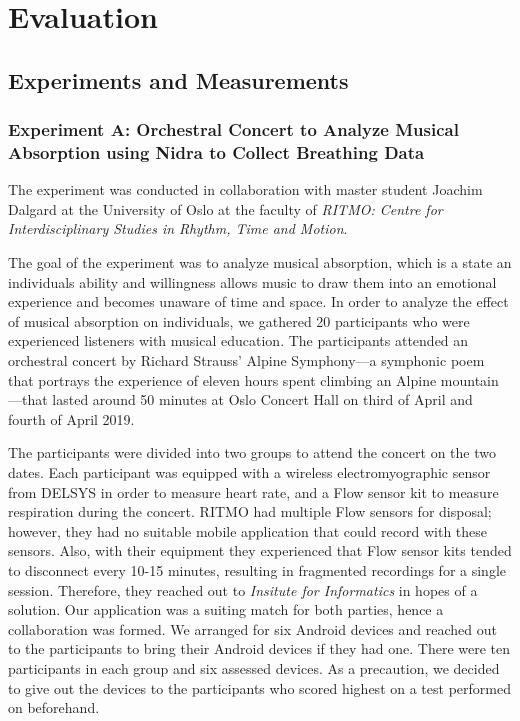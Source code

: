 \chapter{Evaluation}
\section{Experiments and Measurements}
\subsection{Experiment A: Orchestral Concert to Analyze Musical Absorption using Nidra to Collect Breathing Data}
The experiment was conducted in collaboration with master student Joachim Dalgard at the University of Oslo at the faculty of \textit{RITMO: Centre for Interdisciplinary Studies in Rhythm, Time and Motion}. 

The goal of the experiment was to analyze musical absorption, which is a state an individuals ability and willingness allows music to draw them into an emotional experience and becomes unaware of time and space. In order to analyze the effect of musical absorption on individuals, we gathered 20 participants who were experienced listeners with musical education. The participants attended an orchestral concert by Richard Strauss' Alpine Symphony---a symphonic poem that portrays the experience of eleven hours spent climbing an Alpine mountain---that lasted around 50 minutes at Oslo Concert Hall on third of April and fourth of April 2019.  

The participants were divided into two groups to attend the concert on the two dates. Each participant was equipped with a wireless electromyographic sensor from DELSYS in order to measure heart rate, and a Flow sensor kit to measure respiration during the concert. RITMO had multiple Flow sensors for disposal; however, they had no suitable mobile application that could record with these sensors. Also, with their equipment they experienced that Flow sensor kits tended to disconnect every 10-15 minutes, resulting in fragmented recordings for a single session. Therefore, they reached out to \textit{Insitute for Informatics} in hopes of a solution. Our application was a suiting match for both parties, hence a collaboration was formed. We arranged for six Android devices and reached out to the participants to bring their Android devices if they had one. There were ten participants in each group and six assessed devices. As a precaution, we decided to give out the devices to the participants who scored highest on a test performed on beforehand.

